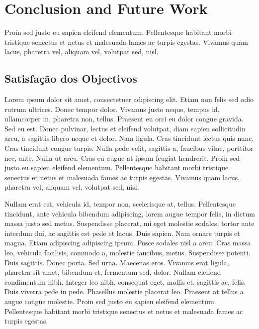 \chapter{Conclusion and Future Work} \label{chap:concl}


Proin sed justo eu sapien eleifend elementum. Pellentesque
habitant morbi tristique senectus et netus et malesuada fames ac
turpis egestas. Vivamus quam lacus, pharetra vel, aliquam vel,
volutpat sed, nisl. 

\section{Satisfação dos Objectivos}

Lorem ipsum dolor sit amet, consectetuer adipiscing elit. Etiam non
felis sed odio rutrum ultrices. Donec tempor dolor. Vivamus justo
neque, tempus id, ullamcorper in, pharetra non, tellus. Praesent eu
orci eu dolor congue gravida. Sed eu est. Donec pulvinar, lectus et
eleifend volutpat, diam sapien sollicitudin arcu, a sagittis libero
neque et dolor. Nam ligula. Cras tincidunt lectus quis nunc. Cras
tincidunt congue turpis. Nulla pede velit, sagittis a, faucibus vitae,
porttitor nec, ante. Nulla ut arcu. Cras eu augue at ipsum feugiat
hendrerit. Proin sed justo eu sapien eleifend elementum. Pellentesque
habitant morbi tristique senectus et netus et malesuada fames ac
turpis egestas. Vivamus quam lacus, pharetra vel, aliquam vel,
volutpat sed, nisl. 

Nullam erat est, vehicula id, tempor non, scelerisque at,
tellus. Pellentesque tincidunt, ante vehicula bibendum adipiscing,
lorem augue tempor felis, in dictum massa justo sed metus. Suspendisse
placerat, mi eget molestie sodales, tortor ante interdum dui, ac
sagittis est pede et lacus. Duis sapien. Nam ornare turpis et
magna. Etiam adipiscing adipiscing ipsum. Fusce sodales nisl a
arcu. Cras massa leo, vehicula facilisis, commodo a, molestie
faucibus, metus. Suspendisse potenti. Duis sagittis. Donec porta. Sed
urna. Maecenas eros. Vivamus erat ligula, pharetra sit amet, bibendum
et, fermentum sed, dolor. Nullam eleifend condimentum nibh. Integer
leo nibh, consequat eget, mollis et, sagittis ac, felis. Duis viverra
pede in pede. Phasellus molestie placerat leo. Praesent at tellus a
augue congue molestie. Proin sed justo eu sapien eleifend
elementum. Pellentesque habitant morbi tristique senectus et netus et
malesuada fames ac turpis egestas. 

